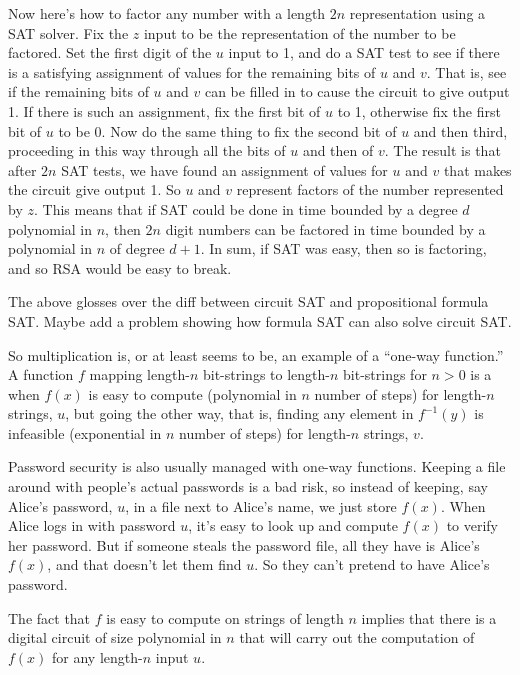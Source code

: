 Now here's how to factor any number with a length $2n$ representation
using a SAT solver.  Fix the $z$ input to be the representation of the
number to be factored.  Set the first digit of the $u$ input to 1, and
do a SAT test to see if there is a satisfying assignment of values for
the remaining bits of $u$ and $v$.  That is, see if the remaining bits
of $u$ and $v$ can be filled in to cause the circuit to give output 1.
If there is such an assignment, fix the first bit of $u$ to 1,
otherwise fix the first bit of $u$ to be 0.  Now do the same thing to
fix the second bit of $u$ and then third, proceeding in this way
through all the bits of $u$ and then of $v$.  The result is that after
$2n$ SAT tests, we have found an assignment of values for $u$ and $v$
that makes the circuit give output 1.  So $u$ and $v$ represent
factors of the number represented by $z$.  This means that if SAT
could be done in time bounded by a degree $d$ polynomial in $n$, then
$2n$ digit numbers can be factored in time bounded by a polynomial in
$n$ of degree $d+1$.  In sum, if SAT was easy, then so is factoring,
and so RSA would be easy to break.

\begin{editingnotes}
The above glosses over the diff between circuit SAT and propositional
formula SAT.  Maybe add a problem showing how formula SAT can also
solve circuit SAT.
\end{editingnotes}

\iffalse

So multiplication is, or
at least seems to be, an example of a ``one-way function.''  A
function $f$ mapping length-$n$ bit-strings to length-$n$ bit-strings
for $n > 0$ is a  when $f(x)$ is easy to
compute (polynomial in $n$ number of steps) for length-$n$ strings,
$u$, but going the other way, that is, finding any element in
$f^{-1}(y)$ is infeasible (exponential in $n$ number of steps) for
length-$n$ strings, $v$.

Password security is also usually managed with one-way functions.
Keeping a file around with people's actual passwords is a bad risk, so
instead of keeping, say Alice's password, $u$, in a file next to
Alice's name, we just store $f(x)$.  When Alice logs in with password
$u$, it's easy to look up and compute $f(x)$ to verify her password.
But if someone steals the password file, all they have is Alice's
$f(x)$, and that doesn't let them find $u$.  So they can't pretend to
have Alice's password.

The fact that $f$ is easy to compute on strings of length $n$ implies
that there is a digital circuit of size polynomial in $n$ that will
carry out the computation of $f(x)$ for any length-$n$ input $u$.

